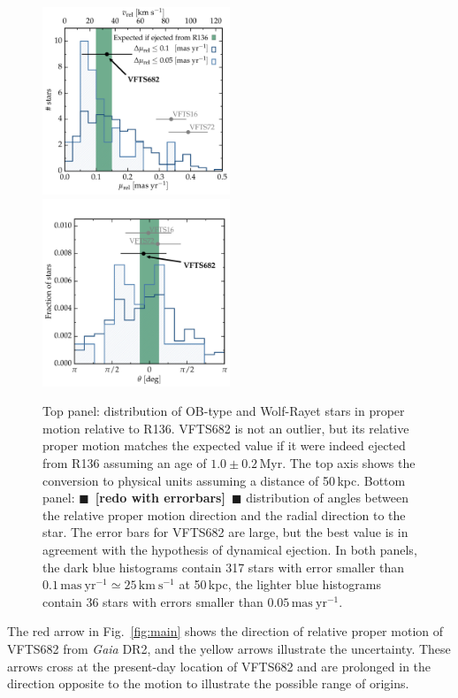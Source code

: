 \documentclass[apjl,twocolumn]{emulateapj}
\newcommand{\todo}[1]{{\large $\blacksquare$~\textbf{\color{red}[#1]}}~$\blacksquare$}
\DeclareRobustCommand{\Eqref}[1]{Eq.~\ref{#1}}
\DeclareRobustCommand{\Figref}[1]{Fig.~\ref{#1}}
\begin{document}
\begin{figure}[htbp]
  \centering
  \includegraphics[width=0.5\textwidth]{figures/dist_mu_region.pdf}\\
  \includegraphics[width=0.5\textwidth]{figures/angle_dist}
  \caption{Top panel: distribution of OB-type and Wolf-Rayet stars in proper
    motion relative to R136. VFTS682 is not an outlier, but
    its relative proper motion matches the expected value if it were indeed
    ejected from R136 assuming an age of $1.0\pm0.2$\,Myr. The top axis shows the conversion to physical units
    assuming a distance of 50\,kpc. Bottom panel: \todo{redo with
      errorbars} distribution of
    angles between the relative proper motion direction and the radial
    direction to the star. The error bars for VFTS682 are large, but
    the best value is in agreement with the hypothesis of dynamical
    ejection. In both
    panels, the dark blue histograms contain 317 
    stars with error smaller than $0.1\,\mathrm{mas \
      yr^{-1}}\simeq25\,\mathrm{km\ s^{-1}}$ at 50\,kpc, the
    lighter blue histograms contain 36 stars with errors smaller than $0.05\,\mathrm{mas \
      yr^{-1}}$. }
  \label{fig:mu_dist}
\end{figure}


The red arrow in \Figref{fig:main} shows the direction of relative proper motion of
VFTS682 from \emph{Gaia} DR2, and the
yellow arrows illustrate the uncertainty. %
These arrows cross at the present-day location of VFTS682 and
are prolonged in the direction opposite to the motion to illustrate
the possible range of origins. %
\end{document}
